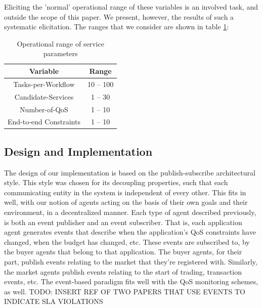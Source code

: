 \documentclass[10pt,journal,compsoc]{IEEEtran}
\begin{document}
Eliciting the 'normal' operational range of these variables is an involved task, and outside the scope of this paper. We present, however, the results of such a systematic elicitation. The ranges that we consider are shown in table \ref{scaling_range}:
\begin{center}
\begin{table}
\begin{tabular}{|c|c|}
\hline
\textbf{Variable} &  \textbf{Range} \\ \hline
Tasks-per-Workflow & 10 -- 100 \\ \hline
Candidate-Services & 1 -- 30 \\ \hline
Number-of-QoS & 1 -- 10 \\ \hline
End-to-end Constraints & 1 -- 10 \\ \hline
\end{tabular}
 \label{scaling_range}
 \caption{Operational range of service parameters}
\end{table}
\end{center}

\subsection{Design and Implementation}
The design of our implementation is based on the publish-subscribe architectural style. This style was chosen for its decoupling properties, such that each communicating entity in the system is independent of every other. This fits in well, with our notion of agents acting on the basis of their own goals and their environment, in a decentralized manner. Each type of agent described previously, is both an event publisher and an event subscriber. That is, each application agent generates events that describe when the application's QoS constraints have changed, when the budget has changed, etc. These events are subscribed to, by the buyer agents that belong to that application. The buyer agents, for their part, publish events relating to the market that they're registered with. Similarly, the market agents publish events relating to the start of trading, transaction events, etc. The event-based paradigm fits well with the QoS monitoring schemes, as well. {TODO: INSERT REF OF TWO PAPERS THAT USE EVENTS TO INDICATE SLA VIOLATIONS}\\
\end{document}
